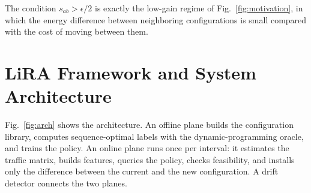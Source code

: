 \documentclass[journal]{IEEEtran}
\begin{document}
The condition $s_{ab}>\epsilon/2$ is exactly the low-gain regime of Fig.~\ref{fig:motivation}, in which the energy difference between neighboring configurations is small compared with the cost of moving between them.

\section{LiRA Framework and System Architecture}\label{sec:framework}

Fig.~\ref{fig:arch} shows the architecture. An offline plane builds the configuration library, computes sequence-optimal labels with the dynamic-programming oracle, and trains the policy. An online plane runs once per interval: it estimates the traffic matrix, builds features, queries the policy, checks feasibility, and installs only the difference between the current and the new configuration. A drift detector connects the two planes.
\end{document}
